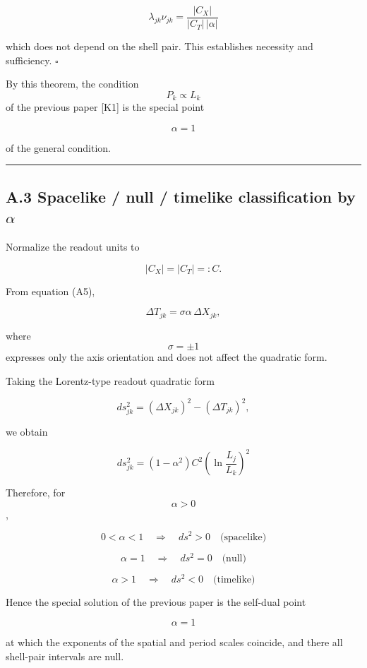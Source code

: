 \documentclass[
  a4paper,
]{article}
\begin{document}
\[
\boxed{
\lambda_{jk}\nu_{jk}
=
\frac{|C_X|}{|C_T|\,|\alpha|}
}
\tag{A8}
\]

which does not depend on the shell pair. This establishes necessity and
sufficiency. \(\square\)

By this theorem, the condition \[P_k\propto L_k\] of the previous paper
{[}K1{]} is the special point

\[
\boxed{\alpha=1}
\]

of the general condition.

\begin{center}\rule{0.5\linewidth}{0.5pt}\end{center}

\subsection{\texorpdfstring{A.3 Spacelike / null / timelike
classification by
\(\alpha\)}{A.3 Spacelike / null / timelike classification by \textbackslash alpha}}\label{a.3-spacelike-null-timelike-classification-by-alpha}

Normalize the readout units to

\[
|C_X|=|C_T|=:C.
\tag{A9}
\]

From equation (A5),

\[
\Delta T_{jk}
=
\sigma\alpha\,\Delta X_{jk},
\]

where \[\sigma=\pm1\] expresses only the axis orientation and does not
affect the quadratic form.

Taking the Lorentz-type readout quadratic form

\[
ds_{jk}^2
=
(\Delta X_{jk})^2
-
(\Delta T_{jk})^2,
\tag{A10}
\]

we obtain

\[
\boxed{
 ds_{jk}^2
=
(1-\alpha^2)
C^2
\left(
\ln\frac{L_j}{L_k}
\right)^2
}
\tag{A11}
\]

Therefore, for \[\alpha>0\],

\[
\boxed{
0<\alpha<1
\quad\Longrightarrow\quad
 ds^2>0
\quad\text{(spacelike)}
}
\tag{A12}
\]

\[
\boxed{
\alpha=1
\quad\Longrightarrow\quad
 ds^2=0
\quad\text{(null)}
}
\tag{A13}
\]

\[
\boxed{
\alpha>1
\quad\Longrightarrow\quad
 ds^2<0
\quad\text{(timelike)}
}
\tag{A14}
\]

Hence the special solution of the previous paper is the self-dual point

\[
\boxed{
\alpha=1
}
\]

at which the exponents of the spatial and period scales coincide, and
there all shell-pair intervals are null.
\end{document}

